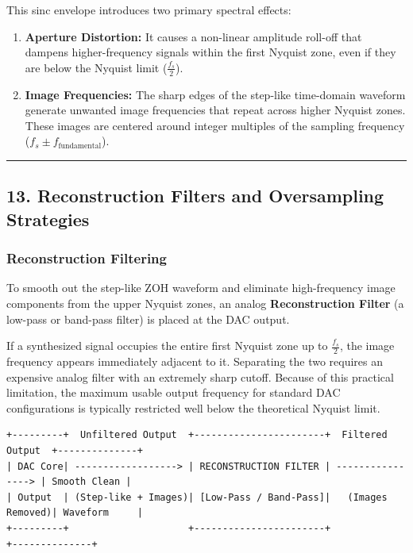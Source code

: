 \documentclass[
]{article}
\providecommand{\tightlist}{%
  \setlength{\itemsep}{0pt}\setlength{\parskip}{0pt}}
\begin{document}
This sinc envelope introduces two primary spectral effects:

\begin{enumerate}
\def\labelenumi{\arabic{enumi}.}
\tightlist
\item
  \textbf{Aperture Distortion:} It causes a non-linear amplitude
  roll-off that dampens higher-frequency signals within the first
  Nyquist zone, even if they are below the Nyquist limit
  (\(\frac{f_s}{2}\)).
\item
  \textbf{Image Frequencies:} The sharp edges of the step-like
  time-domain waveform generate unwanted image frequencies that repeat
  across higher Nyquist zones. These images are centered around integer
  multiples of the sampling frequency
  (\(f_s \pm f_{\text{fundamental}}\)).
\end{enumerate}

\begin{center}\rule{0.5\linewidth}{0.5pt}\end{center}

\subsection{13. Reconstruction Filters and Oversampling
Strategies}\label{reconstruction-filters-and-oversampling-strategies}

\subsubsection{Reconstruction Filtering}\label{reconstruction-filtering}

To smooth out the step-like ZOH waveform and eliminate high-frequency
image components from the upper Nyquist zones, an analog
\textbf{Reconstruction Filter} (a low-pass or band-pass filter) is
placed at the DAC output.

If a synthesized signal occupies the entire first Nyquist zone up to
\(\frac{f_s}{2}\), the image frequency appears immediately adjacent to
it. Separating the two requires an expensive analog filter with an
extremely sharp cutoff. Because of this practical limitation, the
maximum usable output frequency for standard DAC configurations is
typically restricted well below the theoretical Nyquist limit.

\begin{verbatim}
+---------+  Unfiltered Output  +-----------------------+  Filtered Output  +--------------+
| DAC Core| ------------------> | RECONSTRUCTION FILTER | ----------------> | Smooth Clean |
| Output  | (Step-like + Images)| [Low-Pass / Band-Pass]|   (Images Removed)| Waveform     |
+---------+                     +-----------------------+                   +--------------+
\end{verbatim}
\end{document}
